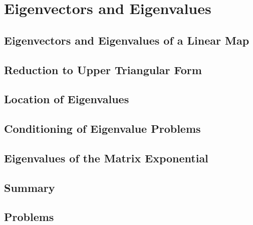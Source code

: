 \documentclass[a4paper]{article}
\begin{document}
\newpage
\section{Eigenvectors and Eigenvalues}
\subsection{ Eigenvectors and Eigenvalues of a Linear Map} %

\subsection{ Reduction to Upper Triangular Form} %

\subsection{ Location of Eigenvalues} %

\subsection{ Conditioning of Eigenvalue Problems} %

\subsection{ Eigenvalues of the Matrix Exponential} %

\subsection{ Summary} %

\subsection{ Problems} %
\end{document}
